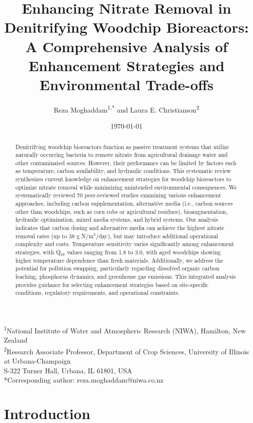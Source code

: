 \documentclass[12pt,a4paper]{article}
\title{Enhancing Nitrate Removal in Denitrifying Woodchip Bioreactors: A Comprehensive Analysis of Enhancement Strategies and Environmental Trade-offs}
\author{Reza Moghaddam\textsuperscript{1,*} and Laura E. Christianson\textsuperscript{2}}
\date{\today}
\begin{document}
\maketitle

\begin{center}
\footnotesize
\textsuperscript{1}National Institute of Water and Atmospheric Research (NIWA), Hamilton, New Zealand\\
\textsuperscript{2}Research Associate Professor, Department of Crop Sciences, University of Illinois at Urbana-Champaign\\
S-322 Turner Hall, Urbana, IL 61801, USA\\
*Corresponding author: reza.moghaddam@niwa.co.nz
\end{center}

\begin{abstract}
Denitrifying woodchip bioreactors function as passive treatment systems that utilize naturally occurring bacteria to remove nitrate from agricultural drainage water and other contaminated sources. However, their performance can be limited by factors such as temperature, carbon availability, and hydraulic conditions. This systematic review synthesizes current knowledge on enhancement strategies for woodchip bioreactors to optimize nitrate removal while minimizing unintended environmental consequences. We systematically reviewed 70 peer-reviewed studies examining various enhancement approaches, including carbon supplementation, alternative media (i.e., carbon sources other than woodchips, such as corn cobs or agricultural residues), bioaugmentation, hydraulic optimization, mixed media systems, and hybrid systems. Our analysis indicates that carbon dosing and alternative media can achieve the highest nitrate removal rates (up to 38 g N/m$^3$/day), but may introduce additional operational complexity and costs. Temperature sensitivity varies significantly among enhancement strategies, with Q$_{10}$ values ranging from 1.8 to 3.0, with aged woodchips showing higher temperature dependence than fresh materials. Additionally, we address the potential for pollution swapping, particularly regarding dissolved organic carbon leaching, phosphorus dynamics, and greenhouse gas emissions. This integrated analysis provides guidance for selecting enhancement strategies based on site-specific conditions, regulatory requirements, and operational constraints.
\end{abstract}

\section{Introduction}
\end{document}
